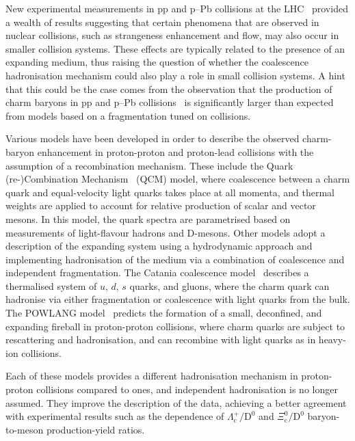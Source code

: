 New experimental measurements in pp and p--Pb collisions at the LHC~\cite{ALICE:2024ozd,ALICE:2016fzo,ALICE:2020wla,ALICE:2020wfu,ALICE:2021bli,CMS:2015fgy} provided a wealth of results suggesting that certain phenomena that are observed in nuclear collisions, such as strangeness enhancement and flow, may also occur in smaller collision systems. These effects are typically related to the presence of an expanding medium, thus raising the question of whether the coalescence hadronisation mechanism could also play a role in small collision systems. A hint that this could be the case comes from the observation that the production of charm baryons in pp and p--Pb collisions~\cite{ALICE:2022exq,ALICE:2024ozd} is significantly larger than expected from models based on a fragmentation tuned on \ee collisions. 

Various models have been developed in order to describe the observed charm-baryon enhancement in proton-proton and proton-lead collisions with the assumption of a recombination mechanism. These include the Quark (re-)Combination Mechanism~\cite{Song:2018tpv} (QCM) model, where coalescence between a charm quark and equal-velocity light quarks takes place at all momenta, and thermal weights are applied to account for relative production of scalar and vector mesons. In this model, the quark spectra are parametrised based on measurements of light-flavour hadrons and D-mesons. Other models adopt a description of the expanding system using a hydrodynamic approach and implementing hadronisation of the medium via a combination of coalescence and independent fragmentation. The Catania coalescence model~\cite{Minissale:2020bif} describes a thermalised system of $u$, $d$, $s$ quarks, and gluons, where the charm quark can hadronise via either fragmentation or coalescence with light quarks from the bulk. The POWLANG model~\cite{Beraudo:2023nlq} predicts the formation of a small, deconfined, and expanding fireball in proton-proton collisions, where charm quarks are subject to rescattering and hadronisation, and can recombine with light quarks as in heavy-ion collisions. 

Each of these models provides a different hadronisation mechanism in proton-proton collisions compared to \ee ones, and independent hadronisation is no longer assumed. They improve the description of the data, achieving a better agreement with experimental results such as the \pt dependence of $\Lambda_\mathrm{c}^+/\mathrm{D}^0$ and $\Xi_\mathrm{c}^0/\mathrm{D}^0$ baryon-to-meson production-yield ratios.

